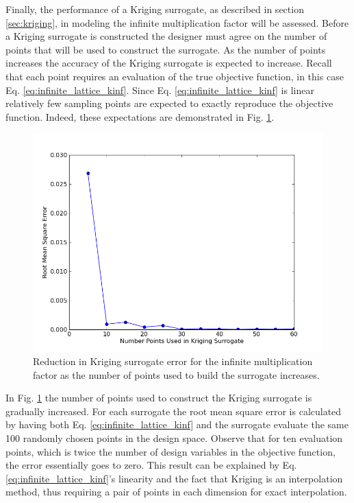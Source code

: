 Finally, the performance of a Kriging surrogate, as described in section \ref{sec:kriging}, in modeling the infinite multiplication factor will be assessed. Before a Kriging surrogate is constructed the designer must agree on the number of points that will be used to construct the surrogate. As the number of points increases the accuracy of the Kriging surrogate is expected to increase. Recall that each point requires an evaluation of the true objective function, in this case Eq. \ref{eq:infinite_lattice_kinf}. Since Eq. \ref{eq:infinite_lattice_kinf} is linear relatively few sampling points are expected to exactly reproduce the objective function. Indeed, these expectations are demonstrated in
Fig. \ref{fig:kinf_kriging}.  
\begin{figure}
\caption[Reduction in Kriging surrogate error for infinite multiplication factor with increase in points.]{ \label{fig:kinf_kriging}
Reduction in Kriging surrogate error for the infinite multiplication factor as the number of points used to build the surrogate increases.}
 \begin{center}
  \includegraphics[scale=.75]{./Chapter3/error_vs_npoints.png}
 \end{center}
\end{figure}

In Fig. \ref{fig:kinf_kriging} the number of points used to construct the Kriging surrogate is gradually increased. For each surrogate the root mean square error is calculated by having both Eq. \ref{eq:infinite_lattice_kinf} and the surrogate evaluate the same 100 randomly chosen points in the design space. Observe that for ten evaluation points, which is twice the number of design variables in the objective function, the error essentially goes to zero. This result can be explained by Eq. \ref{eq:infinite_lattice_kinf}'s linearity and the fact that Kriging is an interpolation method, thus requiring a pair of points in each dimension for exact interpolation.     

   